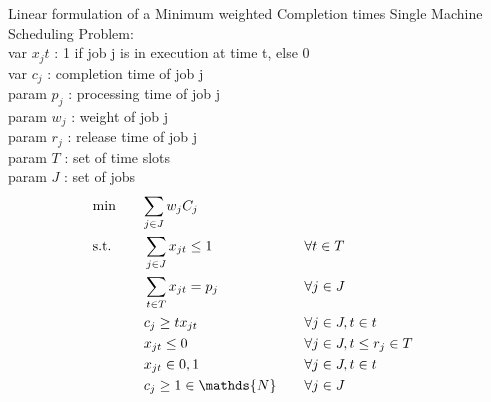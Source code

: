 \documentclass{article}
\begin{document}
Linear formulation of a Minimum weighted Completion times Single Machine Scheduling Problem: \\
var $x_jt$ : 1 if job j is in execution at time t, else 0 \\
var $c_j$ : completion time of job j \\
param $p_j$ : processing time of job j \\
param $w_j$ : weight of job j \\
param $r_j$ : release time of job j \\
param $T$ : set of time slots \\
param $J$ : set of jobs \\

\begin{alignat}{4}
  & \text{min} \quad && \mathrlap{\sum_{j \in J} w_j C_j } \\ %
  & \text{s.t.} \quad && \sum_{j \in J} x_{jt} \leq 1 \quad && \forall t \in T \\
  & && \sum_{t \in T} x_{jt} = p_j \quad && \forall j \in J \\
  & && c_j \geq tx_{jt} \quad && \forall j \in J, t \in t \\
  & && x_{jt} \leq 0 \quad && \forall j \in J, t \leq r_j \in T\\
  & && x_{jt} \in {0, 1} \quad && \forall j \in J, t \in t\\
  & && c_j \geq 1 \in \mathds{N} \quad && \forall j \in J 
\end{alignat}
\end{document}
